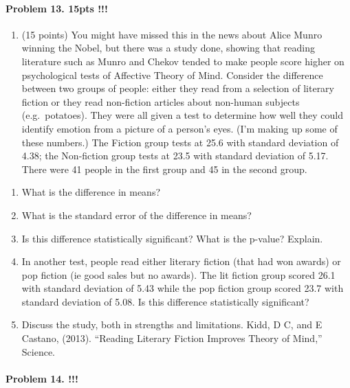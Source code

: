 \documentclass[]{article}
\providecommand{\tightlist}{%
  \setlength{\itemsep}{0pt}\setlength{\parskip}{0pt}}
\let\oldparagraph\paragraph
\renewcommand{\paragraph}[1]{\oldparagraph{#1}\mbox{}}
\begin{document}
\paragraph{Problem 13. 15pts !!!}\label{problem-13.-15pts}

\begin{enumerate}
\def\labelenumi{\arabic{enumi}.}
\setcounter{enumi}{8}
\tightlist
\item
  (15 points) You might have missed this in the news about Alice Munro
  winning the Nobel, but there was a study done, showing that reading
  literature such as Munro and Chekov tended to make people score higher
  on psychological tests of Affective Theory of Mind. Consider the
  difference between two groups of people: either they read from a
  selection of literary fiction or they read non-fiction articles about
  non-human subjects (e.g.~potatoes). They were all given a test to
  determine how well they could identify emotion from a picture of a
  person's eyes. (I'm making up some of these numbers.) The Fiction
  group tests at 25.6 with standard deviation of 4.38; the Non-fiction
  group tests at 23.5 with standard deviation of 5.17. There were 41
  people in the first group and 45 in the second group.
\end{enumerate}

\begin{enumerate}
\def\labelenumi{\roman{enumi}.}
\setcounter{enumi}{15}
\tightlist
\item
  What is the difference in means?
\item
  What is the standard error of the difference in means?
\item
  Is this difference statistically significant? What is the p-value?
  Explain.
\item
  In another test, people read either literary fiction (that had won
  awards) or pop fiction (ie good sales but no awards). The lit fiction
  group scored 26.1 with standard deviation of 5.43 while the pop
  fiction group scored 23.7 with standard deviation of 5.08. Is this
  difference statistically significant?
\item
  Discuss the study, both in strengths and limitations. Kidd, D C, and E
  Castano, (2013). ``Reading Literary Fiction Improves Theory of Mind,''
  Science.
\end{enumerate}

\paragraph{Problem 14. !!!}\label{problem-14.}
\end{document}
